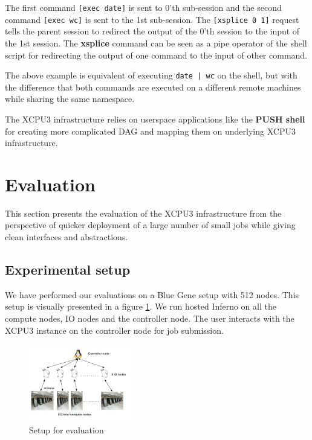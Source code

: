 \documentclass[conference]{IEEEtran}
\begin{document}
The first command \texttt{[exec date]} is sent to 0'th sub-session and the
second command \texttt{[exec wc]} is sent to the 1st sub-session.  The
\texttt{[xsplice 0 1]} request tells the parent session to redirect the output
of the 0'th session to the input of the 1st session.  The \textbf{xsplice}
command can be seen as a pipe operator of the shell script for redirecting the
output of one command to the input of other command.

The above example is equivalent of executing \texttt{date | wc} on the shell,
but with the difference that both commands are executed on a different remote
machines while sharing the same namespace.

The XCPU3 infrastructure relies on userspace applications like the \textbf{PUSH
shell}\cite{PODC:Push} for creating more complicated DAG and mapping them on
underlying XCPU3 infrastructure.

\section{Evaluation}

This section presents the evaluation of the XCPU3 infrastructure from the
perspective of quicker deployment of a large number of small jobs while giving
clean interfaces and abstractions.


\subsection{Experimental setup}
We have performed our evaluations on a Blue Gene setup with 512 nodes.  This
setup is visually presented in a figure \ref{fig:hare}.  We run hosted Inferno
on all the compute nodes, IO nodes and the controller node.  The user interacts 
with the XCPU3 instance on the controller node for job submission.


\begin{figure}[h]
  \begin{center}
    \leavevmode
      \includegraphics[height=0.2\textheight,width=0.4\textwidth]
		{./img/EvaluationSetup}
    \caption{Setup for evaluation}
    \label{fig:hare}
  \end{center}
\end{figure}
\end{document}
